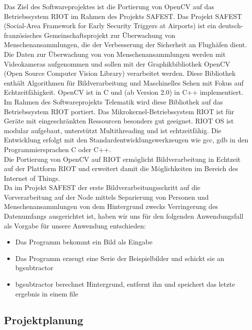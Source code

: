 \documentclass[10pt,a4paper]{article}
\begin{document}
Das Ziel des Softwareprojektes ist die Portierung von OpenCV auf das Betriebssystem RIOT im Rahmen des Projekts SAFEST.
Das Projekt SAFEST (Social-Area Framework for Early Security Triggers at Airports) ist ein deutsch-französisches Gemeinschaftsprojekt zur Überwachung von Menschenansammlungen, die der Verbesserung der Sicherheit an Flughäfen dient. \\

Die Daten zur Überwachung von von Menschenansammlungen werden mit Videokameras aufgenommen und sollen mit der Graphikbibliothek OpenCV (Open Source Computer Vision Library) verarbeitet werden. Diese Bibliothek enthält Algorithmen für Bildverarbeitung und Maschinelles Sehen mit Fokus auf Echtzeitfähigkeit. OpenCV ist in C und (ab Version 2.0) in C++ implementiert. \\

Im Rahmen des Softwareprojekts Telematik wird diese Bibliothek auf das Betriebssystem RIOT portiert. Das Mikrokernel-Betriebssystem RIOT ist für Geräte mit eingeschränkten Ressourcen besonders gut geeignet. RIOT OS ist modular aufgebaut, unterstützt Multithreading und ist echtzeitfähig. Die Entwicklung erfolgt mit den Standardentwicklungswerkzeugen wie gcc, gdb in den Programmiersprachen C oder C++. \\

Die Portierung von OpenCV auf RIOT ermöglicht Bildverarbeitung in Echtzeit auf der Plattform RIOT und erweitert damit die Möglichkeiten im Bereich des Internet of Things. \\

Da im Projekt SAFEST der erste Bildverarbeitungsschritt auf die Vorverarbeitung auf der Node mittels Separierung von Personen und Menschenansammlungen von dem Hintergrund zwecks Verringerung des Datenumfangs ausgerichtet ist, haben wir uns für den folgenden Anwendungsfall als Vorgabe für unsere Anwendung entschieden: 

\begin{itemize}
\item Das Programm bekommt ein Bild als Eingabe
\item Das Programm erzeugt eine Serie der Beispielbilder und schickt sie an bgsubtractor
\item bgsubtractor berechnet Hintergrund, entfernt ihn und speichert das letzte ergebnis in einem file
\end{itemize}

\subsection{Projektplanung}
\end{document}
